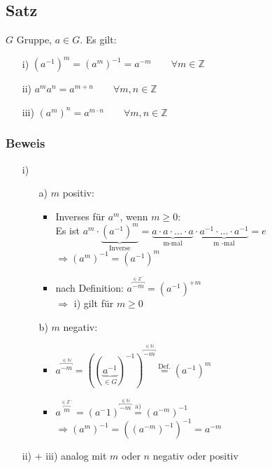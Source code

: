 \documentclass[12pt,titlepage, pdf]{article}
\renewcommand{\>}{\rightarrow}
\renewcommand{\*}{\cdot}
\begin{document}
	      \subsection{Satz}
	      $G$ Gruppe, $a \in G$. Es gilt:
	      \begin{itemize}
	      	\item[i)] $(a^{-1})^m = (a^m)^{-1} = a^{-m} \qquad \forall m \in \mathds{Z}$
	      	\item[ii)] $a^ma^n = a^{m+n} \qquad \forall m,n \in \mathds{Z}$
	      	\item[iii)] $(a^m)^n = a^{m \cdot n} \qquad \forall m,n \in \mathds{Z}$
	      \end{itemize}
	      \subsubsection*{Beweis}
	      \begin{itemize}
	      	\item[i)] 
	      	      \begin{itemize}
	      	      	\item[a)] $m$ positiv:
	      	      	      \begin{itemize}
	      	      	      	\item Inverses für $a^m$, wenn $m \geq 0:$ \\
	      	      	      	      Es ist $a^m  \cdot \underbrace{(a^{-1})^m}_{\text{Inverse}} = \underbrace{a \cdot a \cdot ... \cdot a}_{\text{m-mal}} \cdot \underbrace{ a^{-1} \cdot ... \cdot a^{-1}}_{\text{m -mal}} = e$ \\
	      	      	      	      $\Rightarrow (a^m)^{-1}= (a^{-1})^m$
	      	      	      	\item nach Definition: $a^{\overbracket{-m}^{\in \mathds{Z^-}}} = (a^{-1})^{+m}$ \\
	      	      	      	      $\Rightarrow$ i) gilt für $m \geq 0$
	      	      	      \end{itemize}
	      	      	\item[b)] $m$ negativ:
	      	      	      \begin{itemize}
	      	      	      	\item $a^{\overbracket{-m}^{ \in \mathds{N}}} = ((\underbrace{a^{-1}}_{\in G})^{-1})^{\overbracket{-m}^{ \in \mathds{N}}} \overset{\textrm{Def.}}{=} (a^{-1})^m$
	      	      	      	\item $a^{\overbracket{m}^{ \in \mathds{Z}^-}} = (a^-1)^{\overbracket{-m}^{ \in \mathds{N}}} \overset{\textrm{a)}}{=} (a^{-m})^{-1}$\\$ \Rightarrow (a^m)^{-1} = ((a^{-m})^{-1})^{-1} = a^{-m}$
	      	      	      \end{itemize}	
	      	      \end{itemize}
	      	\item[ii) + iii)] analog mit $m$ oder $n$ negativ oder positiv 
	      \end{itemize}
\end{document}
